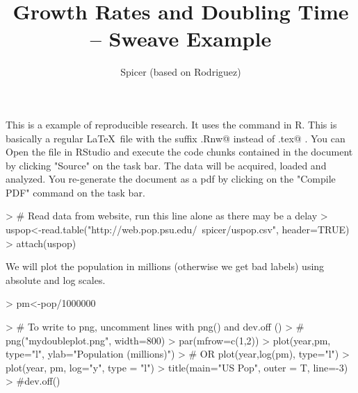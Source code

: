 \documentclass[a4paper]{article}
\title{Growth Rates and Doubling Time -- Sweave Example}
\author{Spicer (based on Rodriguez)}
\begin{document}

\maketitle This is a example of reproducible research.  
It uses the \verb@Sweave@ command in R.  This is basically a regular \LaTeX\ file with the suffix \verb@.Rnw@ instead of \verb@.tex@ .  You can Open the file in RStudio and execute the code chunks contained in the document by clicking "Source" on the task bar. The data will be acquired, loaded and analyzed.  You re-generate the document as a pdf by clicking on the "Compile PDF" command on the task bar. 

\begin{Schunk}
\begin{Sinput}
> # Read data from website, run this line alone as there may be a delay 
> uspop<-read.table("http://web.pop.psu.edu/~spicer/uspop.csv", header=TRUE)
> attach(uspop)
\end{Sinput}
\end{Schunk}
We will plot the population in millions (otherwise we get bad labels) using absolute and log scales.
\begin{Schunk}
\begin{Sinput}
> pm<-pop/1000000
\end{Sinput}
\end{Schunk}
\begin{Schunk}
\begin{Sinput}
> # To write to png, uncomment lines with png() and dev.off () 
> # png("mydoubleplot.png", width=800)
> par(mfrow=c(1,2))
> plot(year,pm, type="l",  ylab="Population (millions)")
> # OR plot(year,log(pm), type="l")
> plot(year, pm, log="y", type = "l")
> title(main="US Pop", outer = T, line=-3) 
> #dev.off()
\end{Sinput}
\end{Schunk}
\end{document}
